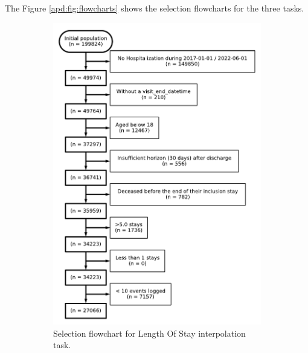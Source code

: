 \documentclass[french,12pt,twoside,a4paper]{book}
\begin{document}
\begin{appendices}
  The Figure \ref{apd:fig:flowcharts} shows the selection flowcharts for the three tasks.

  \begin{figure}[!h]
    \centering
    \begin{subfigure}[b]{0.45\textwidth}
      \centering
      \includegraphics[width=\textwidth]{img/chapter_3/flowchart_t1_los.pdf}
      \caption{Selection flowchart for Length Of Stay interpolation task.}
      \label{apd:fig:flowchart_t1}
    \end{subfigure}
    \hfill
    \begin{subfigure}[b]{0.5\textwidth}
      \centering

\end{subfigure}
\end{figure}
\end{appendices}
\end{document}
